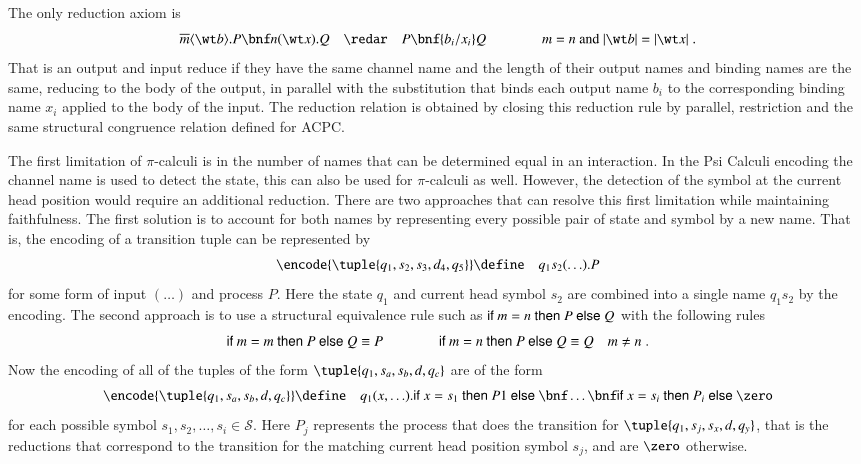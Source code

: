 \documentclass[submission,copyright,creativecommons]{eptcs}
\begin{document}
The only reduction axiom is
$$
\pioap m {\wt b}.P\bnf \piiap n {\wt x}.Q \quad\redar\quad P\bnf \{b_i/x_i\}Q
\qquad\qquad m=n \mbox{\ and\ } |\wt b|=|\wt x|\; .
$$
That is an output and input reduce if they have the same channel name and the
length of their output names and binding names are the same, reducing to
the body of the output, in parallel with
the substitution that binds each output name $b_i$ to the corresponding binding name $x_i$
applied to the body of the input.
The reduction relation is obtained by closing this reduction rule by parallel, restriction and the
same structural congruence relation defined for ACPC.



The first limitation of $\pi$-calculi is in the number of names that can be determined
equal in an interaction. In the Psi Calculi encoding 
the channel name is used to detect the state, this can also be used for $\pi$-calculi as
well.
However, the detection of the symbol at the current head position would require an additional
reduction.
There are two approaches that can resolve this first limitation while maintaining faithfulness.
The first solution is to account for both names by representing every possible
pair of state and symbol by a new name. That is, the encoding of a transition tuple
can be represented by
\begin{eqnarray*}
\encode{\tuple{q_1,s_2,s_3,d_4,q_5}} &\define& {q_1 s_2} (\ldots).P
\end{eqnarray*}
for some form of input $(\ldots)$ and process $P$. Here the state $q_1$ and current
head symbol $s_2$ are combined into a single name $q_1 s_2$ by the encoding.
The second approach is to use a structural equivalence rule such as
${\sf if}\ m=n\ {\sf then}\ P\ {\sf else}\ Q$ with the following rules
\begin{equation*}
{\sf if}\ m=m\ {\sf then}\ P\ {\sf else}\ Q \equiv P \qquad\qquad {\sf if}\ m=n\ {\sf then}\ P\ {\sf else}\ Q \equiv Q\quad m\neq n \; .
\end{equation*}
Now the encoding of all of the tuples of the form $\tuple{q_1,s_a,s_b,d,q_c}$
are of the form
\begin{eqnarray*}
\encode{\tuple{q_1,s_a,s_b,d,q_c}} &\define& q_1(x,\ldots).
\ifte x {s_1} {P1} { }
\bnf \hdots
\bnf \ifte x {s_i} {P_i} \zero
\end{eqnarray*}
for each possible symbol $s_1,s_2,\ldots,s_i\in{\mathcal S}$.
Here $P_j$ represents the process that does the transition for
$\tuple{q_1,s_j,s_x,d,q_y}$, that is the reductions that correspond to the
transition for the matching current head position symbol $s_j$, and are $\zero$
otherwise.
\end{document}
